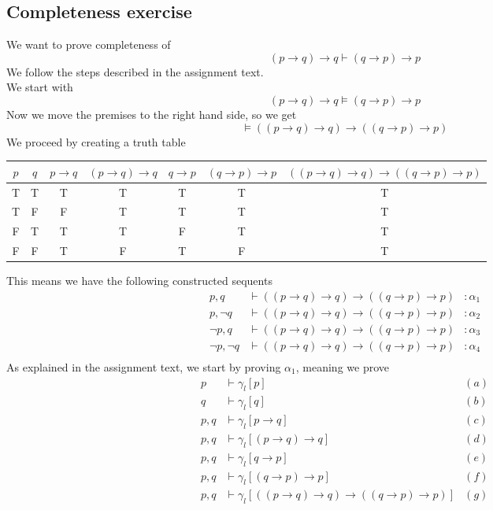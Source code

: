 \documentclass[12pt]{article}
\begin{document}
\subsection*{Completeness exercise}
We want to prove completeness of
$$(p\to q)\to q \vdash (q\to p)\to p$$
We follow the steps described in the assignment text.\\
We start with
$$(p\to q)\to q \models (q\to p)\to p$$
Now we move the premises to the right hand side, so we get
$$\models ((p\to q)\to q)\to((q\to p)\to p)$$
We proceed by creating a truth table
\begin{center}
\begin{tabular}{|c|c||c|c|c|c||c|}
\hline 
$p$ & $q$ & $p\to q$ & $(p\to q)\to q$ & $q\to p$ & $(q\to p)\to p$ & $((p\to q)\to q)\to((q\to p)\to p)$ \\ 
\hline 
T & T & T & T & T & T & T \\ 
\hline 
T & F & F & T & T & T & T \\ 
\hline 
F & T & T & T & F & T & T \\ 
\hline 
F & F & T & F & T & F & T \\ 
\hline 
\end{tabular} 
\end{center}
This means we have the following constructed sequents
\begin{align*}
p,q&\vdash((p\to q)\to q)\to((q\to p)\to p) &:\alpha_1\\
p,\neg q&\vdash((p\to q)\to q)\to((q\to p)\to p) &:\alpha_2\\
\neg p,q&\vdash((p\to q)\to q)\to((q\to p)\to p) &:\alpha_3\\
\neg p,\neg q&\vdash((p\to q)\to q)\to((q\to p)\to p)&:\alpha_4 \\
\end{align*}
As explained in the assignment text, we start by proving $\alpha_1$, meaning we prove
\begin{align*}
p&\vdash \gamma_{\textit{l}}[p] &(a) \\
q&\vdash \gamma_{\textit{l}}[q] &(b)\\
p,q&\vdash \gamma_{\textit{l}}[p\to q]&(c)\\
p,q&\vdash \gamma_{\textit{l}}[(p\to q)\to q]&(d)\\
p,q&\vdash \gamma_{\textit{l}}[q\to p]&(e)\\
p,q&\vdash \gamma_{\textit{l}}[(q\to p)\to p]&(f)\\
p,q&\vdash \gamma_{\textit{l}}[((p\to q)\to q)\to((q\to p)\to p)]&(g)
\end{align*}
\end{document}
